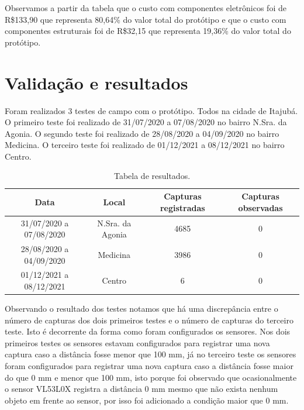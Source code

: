 \documentclass[
	12pt,				%
	openright,			%
	oneside,			%
	a4paper,			%
	chapter=TITLE,		%
	english,			%
	brazil				%
	]{abntex2}
\begin{document}
Observamos a partir da tabela que o custo com componentes eletrônicos foi de R\$133,90 que representa 80,64\% do valor total do protótipo e que o custo com 
componentes estruturais foi de R\$32,15 que representa 19,36\% do valor total do protótipo.

\chapter{Validação e resultados}

Foram realizados 3 testes de campo com o protótipo. Todos na cidade de Itajubá. O primeiro teste foi realizado de 31/07/2020 a 07/08/2020 no bairro N.Sra. da Agonia.
O segundo teste foi realizado de 28/08/2020 a 04/09/2020 no bairro Medicina. O terceiro teste foi realizado de 01/12/2021 a 08/12/2021 no bairro Centro.

\begin{center}     
    \begin{table}[H]
        \caption{Tabela de resultados.}
        \label{tab:resultados} 
        \begin{adjustbox}{width=\textwidth}  
    \begin{tabular}{ |c|c|c|c| }                           
        \hline
        \rowcolor{lightgray} \textbf{Data} & \textbf{Local} & \textbf{Capturas registradas} & \textbf{Capturas observadas} \\
        \hline
        31/07/2020 a 07/08/2020 & N.Sra. da Agonia & 4685 & 0 \\
        \hline
        28/08/2020 a 04/09/2020 & Medicina & 3986 & 0 \\
        \hline
        01/12/2021 a 08/12/2021 & Centro & 6 & 0 \\
        \hline
    \end{tabular}  
\end{adjustbox}
\end{table}    
\end{center}

Observando o resultado dos testes notamos que há uma discrepância entre o número de capturas dos dois primeiros testes e o número de capturas do terceiro teste. Isto é decorrente
da forma como foram configurados os sensores. Nos dois primeiros testes os sensores estavam configurados para registrar uma nova captura caso a distância fosse menor que 100 mm, já no terceiro
teste os sensores foram configurados para registrar uma nova captura caso a distância fosse maior do que 0 mm e menor que 100 mm, isto porque foi observado que ocasionalmente o sensor 
VL53L0X registra a distância 0 mm mesmo que não exista nenhum objeto em frente ao sensor, por isso foi adicionado a condição maior que 0 mm.
\end{document}
